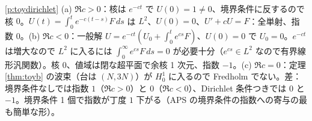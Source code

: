 \begin{sol}{\ref{p:toydirichlet}}
(a) $\Re c>0$：核は $e^{-ct}$ で $U(0)=1\ne0$、境界条件に反するので核 $0$。$U(t)=\int_0^te^{-c(t-s)}F\,ds$ は $L^2$、$U(0)=0$、$U'+cU=F$：全単射、指数 $0$。(b) $\Re c<0$：一般解 $U=e^{-ct}(U_0+\int_0^te^{cs}F)$、$U(0)=0$ で $U_0=0$。$e^{-ct}$ は増大なので $L^2$ に入るには $\int_0^\infty e^{cs}F\,ds=0$ が必要十分（$e^{cs}\in L^2$ なので有界線形汎関数）。核 $0$、値域は閉な超平面で余核 1 次元、指数 $-1$。(c) $\Re c=0$：定理 \ref{thm:toyb} の波束（台は $(N,3N)$）が $H^1_0$ に入るので Fredholm でない。差：境界条件なしでは指数 $1$（$\Re c>0$）と $0$（$\Re c<0$）、Dirichlet 条件つきでは $0$ と $-1$。境界条件 1 個で指数が丁度 $1$ 下がる（APS の境界条件の指数への寄与の最も簡単な形）。
\end{sol}

